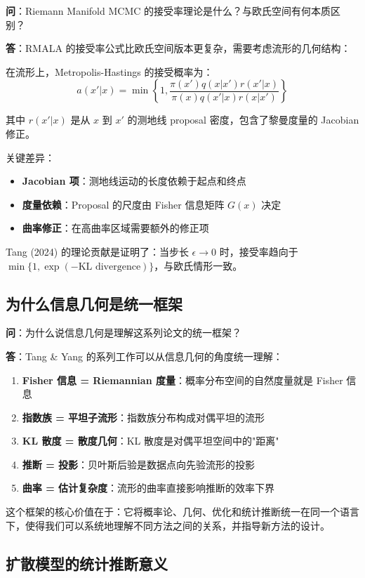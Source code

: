 \textbf{问}：Riemann Manifold MCMC 的接受率理论是什么？与欧氏空间有何本质区别？

\textbf{答}：RMALA 的接受率公式比欧氏空间版本更复杂，需要考虑流形的几何结构：

在流形上，Metropolis-Hastings 的接受概率为：
$$a(x'|x) = \min\left\{1, \frac{\pi(x') q(x|x') r(x'|x)}{ \pi(x) q(x'|x) r(x|x')}\right\}$$

其中 $r(x'|x)$ 是从 $x$ 到 $x'$ 的测地线 proposal 密度，包含了黎曼度量的 Jacobian 修正。

关键差异：
\begin{itemize}
    \item \textbf{Jacobian 项}：测地线运动的长度依赖于起点和终点
    \item \textbf{度量依赖}：Proposal 的尺度由 Fisher 信息矩阵 $G(x)$ 决定
    \item \textbf{曲率修正}：在高曲率区域需要额外的修正项
\end{itemize}

Tang (2024) 的理论贡献是证明了：当步长 $\epsilon \to 0$ 时，接受率趋向于 $\min\{1, \exp(-\text{KL divergence})\}$，与欧氏情形一致。

\subsection{为什么信息几何是统一框架}\label{sec:qa-info-geometry-unified}

\textbf{问}：为什么说信息几何是理解这系列论文的统一框架？

\textbf{答}：Tang \& Yang 的系列工作可以从信息几何的角度统一理解：

\begin{enumerate}
    \item \textbf{Fisher 信息 = Riemannian 度量}：概率分布空间的自然度量就是 Fisher 信息
    \item \textbf{指数族 = 平坦子流形}：指数族分布构成对偶平坦的流形
    \item \textbf{KL 散度 = 散度几何}：KL 散度是对偶平坦空间中的"距离"
    \item \textbf{推断 = 投影}：贝叶斯后验是数据点向先验流形的投影
    \item \textbf{曲率 = 估计复杂度}：流形的曲率直接影响推断的效率下界
\end{enumerate}

这个框架的核心价值在于：它将概率论、几何、优化和统计推断统一在同一个语言下，使得我们可以系统地理解不同方法之间的关系，并指导新方法的设计。

\subsection{扩散模型的统计推断意义}\label{sec:qa-diffusion-statistical-inference}

